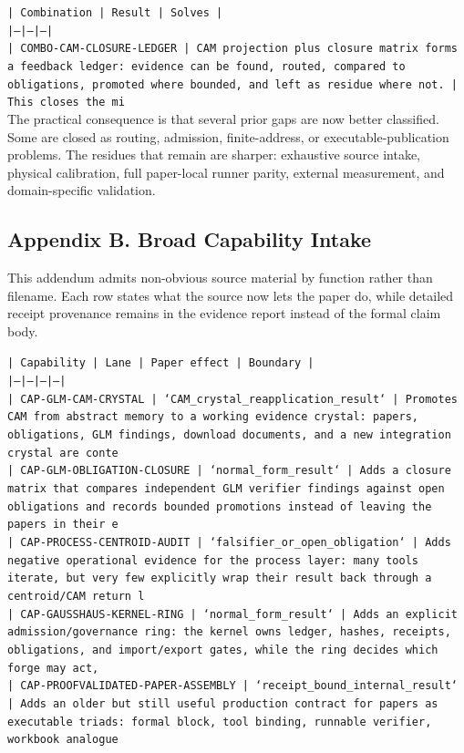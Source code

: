 \documentclass[11pt]{article}
\begin{document}
\noindent\texttt{| Combination | Result | Solves |}\\
\noindent\texttt{|---|---|---|}\\
\noindent\texttt{| COMBO-CAM-CLOSURE-LEDGER | CAM projection plus closure matrix forms a feedback ledger: evidence can be found, routed, compared to obligations, promoted where bounded, and left as residue where not. | This closes the mi}\\

The practical consequence is that several prior gaps are now better classified. Some are closed as routing, admission, finite-address, or executable-publication problems. The residues that remain are sharper: exhaustive source intake, physical calibration, full paper-local runner parity, external measurement, and domain-specific validation.

\subsection*{Appendix B. Broad Capability Intake}

This addendum admits non-obvious source material by function rather than filename. Each row states what the source now lets the paper do, while detailed receipt provenance remains in the evidence report instead of the formal claim body.

\noindent\texttt{| Capability | Lane | Paper effect | Boundary |}\\
\noindent\texttt{|---|---|---|---|}\\
\noindent\texttt{| CAP-GLM-CAM-CRYSTAL | `CAM\_crystal\_reapplication\_result` | Promotes CAM from abstract memory to a working evidence crystal: papers, obligations, GLM findings, download documents, and a new integration crystal are conte}\\
\noindent\texttt{| CAP-GLM-OBLIGATION-CLOSURE | `normal\_form\_result` | Adds a closure matrix that compares independent GLM verifier findings against open obligations and records bounded promotions instead of leaving the papers in their e}\\
\noindent\texttt{| CAP-PROCESS-CENTROID-AUDIT | `falsifier\_or\_open\_obligation` | Adds negative operational evidence for the process layer: many tools iterate, but very few explicitly wrap their result back through a centroid/CAM return l}\\
\noindent\texttt{| CAP-GAUSSHAUS-KERNEL-RING | `normal\_form\_result` | Adds an explicit admission/governance ring: the kernel owns ledger, hashes, receipts, obligations, and import/export gates, while the ring decides which forge may act,}\\
\noindent\texttt{| CAP-PROOFVALIDATED-PAPER-ASSEMBLY | `receipt\_bound\_internal\_result` | Adds an older but still useful production contract for papers as executable triads: formal block, tool binding, runnable verifier, workbook analogue}\\
\end{document}
